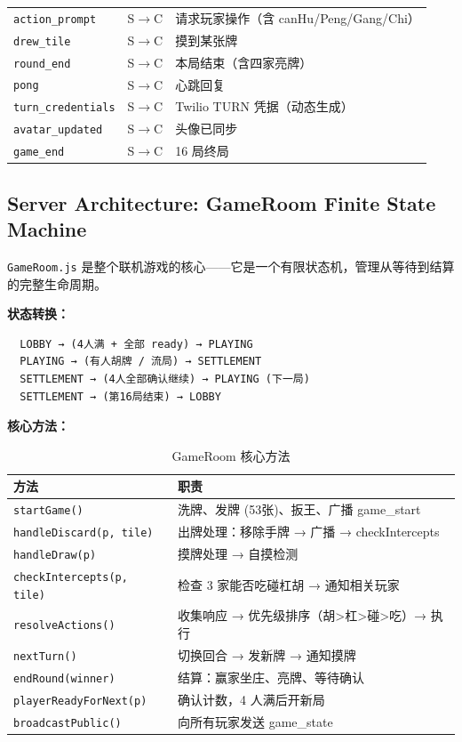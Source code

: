 \documentclass[11pt,a4paper]{article}
\begin{document}
\begin{table}[H]
\begin{tabular}{@{}llp{5.5cm}@{}}
\texttt{action\_prompt} & S$\to$C & 请求玩家操作（含 canHu/Peng/Gang/Chi） \\
\texttt{drew\_tile} & S$\to$C & 摸到某张牌 \\
\texttt{round\_end} & S$\to$C & 本局结束（含四家亮牌） \\
\texttt{pong} & S$\to$C & 心跳回复 \\
\texttt{turn\_credentials} & S$\to$C & Twilio TURN 凭据（动态生成） \\
\texttt{avatar\_updated} & S$\to$C & 头像已同步 \\
\texttt{game\_end} & S$\to$C & 16 局终局 \\
\bottomrule
\end{tabular}
\end{table}

\subsection{Server Architecture: GameRoom Finite State Machine}

\texttt{GameRoom.js} 是整个联机游戏的核心——它是一个有限状态机，管理从等待到结算的完整生命周期。

\textbf{状态转换：}
\begin{verbatim}
  LOBBY → (4人满 + 全部 ready) → PLAYING
  PLAYING → (有人胡牌 / 流局) → SETTLEMENT
  SETTLEMENT → (4人全部确认继续) → PLAYING (下一局)
  SETTLEMENT → (第16局结束) → LOBBY
\end{verbatim}

\textbf{核心方法：}

\begin{table}[H]
\centering
\caption{GameRoom 核心方法}
\label{tab:gameroom}
\small
\begin{tabular}{@{}ll@{}}
\toprule
\textbf{方法} & \textbf{职责} \\
\midrule
\texttt{startGame()} & 洗牌、发牌 (53张)、扳王、广播 game\_start \\
\texttt{handleDiscard(p, tile)} & 出牌处理：移除手牌 → 广播 → checkIntercepts \\
\texttt{handleDraw(p)} & 摸牌处理 → 自摸检测 \\
\texttt{checkIntercepts(p, tile)} & 检查 3 家能否吃碰杠胡 → 通知相关玩家 \\
\texttt{resolveActions()} & 收集响应 → 优先级排序（胡>杠>碰>吃）→ 执行 \\
\texttt{nextTurn()} & 切换回合 → 发新牌 → 通知摸牌 \\
\texttt{endRound(winner)} & 结算：赢家坐庄、亮牌、等待确认 \\
\texttt{playerReadyForNext(p)} & 确认计数，4 人满后开新局 \\
\texttt{broadcastPublic()} & 向所有玩家发送 game\_state \\
\bottomrule
\end{tabular}
\end{table}
\end{document}
